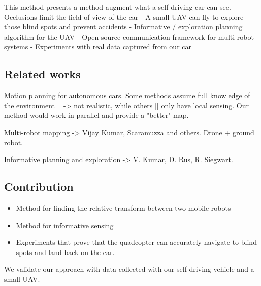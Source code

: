This method presents a method augment what a self-driving car can see.
- Occlusions limit the field of view of the car
- A small UAV can fly to explore those blind spots and prevent accidents
- Informative / exploration planning algorithm for the UAV
- Open source communication framework for multi-robot systems
- Experiments with real data captured from our car 

\subsection{Related works}

Motion planning for autonomous cars. Some methods assume full knowledge of the environment [] -> not realistic, while others [] only have local sensing. Our method would work in parallel and provide a "better" map.

Multi-robot mapping -> Vijay Kumar, Scaramuzza and others. Drone + ground robot.

Informative planning and exploration -> V. Kumar, D. Rus, R. Siegwart.

\subsection{Contribution}

\begin{itemize}
\item
Method for finding the relative transform between two mobile robots
\item
Method for informative sensing
\item
Experiments that prove that the quadcopter can accurately navigate
to blind spots and land back on the car.
\end{itemize}

We validate our approach with data collected with our self-driving vehicle and a small UAV.